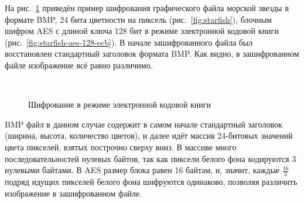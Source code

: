 На рис.~\ref{fig:ecb-demo} приведён пример шифрования графического файла морской звезды в формате BMP, 24 бита цветности на пиксель (рис.~\ref{fig:starfish}), блочным шифром AES с длиной ключа 128 бит в режиме электронной кодовой книги (рис.~\ref{fig:starfish-aes-128-ecb}). В начале зашифрованного файла был восстановлен стандартный заголовок формата BMP. Как видно, в зашифрованном файле изображение всё равно различимо.
\begin{figure}[!ht]
    \centering
    ~~~
    \caption{Шифрование в режиме электронной кодовой книги\label{fig:ecb-demo}}
\end{figure}
BMP файл в данном случае содержит в самом начале стандартный заголовок (ширина, высота, количество цветов), и далее идёт массив 24-битовых значений цвета пикселей, взятых построчно сверху вниз. В массиве много последовательностей нулевых байтов, так как пиксели белого фона кодируются 3 нулевыми байтами. В AES размер блока равен 16 байтам, и, значит, каждые $\frac{16}{3}$ подряд идущих пикселей белого фона шифруются одинаково, позволяя различить изображение в зашифрованном файле.

